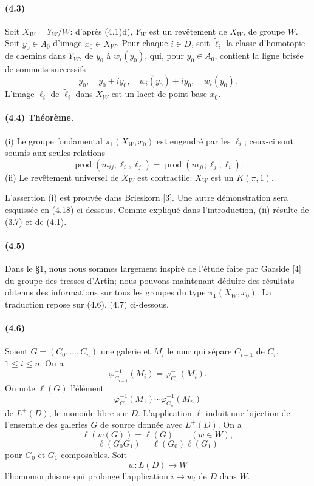 \documentclass[10pt]{article}
\newcommand{\prodalt}{\operatorname{prod}}
\begin{document}
\paragraph{(4.3)} Soit \(X_W=Y_W/W\): d'après (4.1)d), \(Y_W\) est un revêtement de \(X_W\), de groupe \(W\). Soit \(y_0\in A_0\) d'image \(x_0\in X_W\). Pour chaque \(i\in D\), soit \(\widetilde \ell_i\) la classe d'homotopie de chemins dans \(Y_W\), de \(y_0\) à \(w_i(y_0)\), qui, pour \(y_0\in A_0\), contient la ligne brisée de sommets successifs
\[
y_0,\quad y_0+iy_0,\quad w_i(y_0)+iy_0,\quad w_i(y_0).
\]
L'image \(\ell_i\) de \(\widetilde\ell_i\) dans \(X_W\) est un lacet de point base \(x_0\).

\paragraph{(4.4) Théorème.} (i) Le groupe fondamental \(\pi_1(X_W,x_0)\) est engendré par les \(\ell_i\); ceux-ci sont soumis aux seules relations
\[
\tag{4.4.1}
\prodalt(m_{ij};\ell_i,\ell_j)=\prodalt(m_{ji};\ell_j,\ell_i).
\]
(ii) Le revêtement universel de \(X_W\) est contractile: \(X_W\) est un \(K(\pi,1)\).

L'assertion (i) est prouvée dans Brieskorn [3]. Une autre démonstration sera esquissée en (4.18) ci-dessous. Comme expliqué dans l'introduction, (ii) résulte de (3.7) et de (4.1).

\paragraph{(4.5)} Dans le §1, nous nous sommes largement inspiré de l'étude faite par Garside [4] du groupe des tresses d'Artin; nous pouvons maintenant déduire des résultats obtenus des informations sur tous les groupes du type \(\pi_1(X_W,x_0)\). La traduction repose sur (4.6), (4.7) ci-dessous.

\paragraph{(4.6)} Soient \(G=(C_0,\ldots,C_n)\) une galerie et \(M_i\) le mur qui sépare \(C_{i-1}\) de \(C_i\), \(1\le i\le n\). On a
\[
\varphi^{-1}_{C_{i-1}}(M_i)=\varphi^{-1}_{C_i}(M_i).
\]
On note \(\ell(G)\) l'élément
\[
\varphi^{-1}_{C_1}(M_1)\cdots \varphi^{-1}_{C_n}(M_n)
\]
de \(L^+(D)\), le monoïde libre sur \(D\). L'application \(\ell\) induit une bijection de l'ensemble des galeries \(G\) de source donnée avec \(L^+(D)\). On a
\[
\tag{4.6.1}
\ell(w(G))=\ell(G)\qquad(w\in W),
\]
\[
\tag{4.6.2}
\ell(G_0G_1)=\ell(G_0)\ell(G_1)
\]
pour \(G_0\) et \(G_1\) composables. Soit
\[
w:L(D)\longrightarrow W
\]
l'homomorphisme qui prolonge l'application \(i\mapsto w_i\) de \(D\) dans \(W\).
\end{document}

